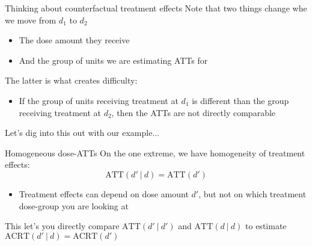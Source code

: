 \documentclass[aspectratio=43,t]{beamer}
\begin{document}
\begin{frame}{Thinking about counterfactual treatment effects}
  Note that two things change whe we move from $d_1$ to $d_2$
  \begin{itemize}
    \item The dose amount they receive

    \item And the group of units we are estimating ATTs for
  \end{itemize}

  \bigskip
  The latter is what creates difficulty:
  \begin{itemize}
    \item If the group of units receiving treatment at $d_1$ is different than the group receiving treatment at $d_2$, then the ATTs are not directly comparable
  \end{itemize}

  \pause
  \bigskip
  Let's dig into this out with our example...
\end{frame}


\begin{frame}{Homogeneous dose-ATTs}
  On the one extreme, we have homogeneity of treatment effects:
  $$
    \text{ATT}(d'  \ | \ d) = \text{ATT}(d')
  $$

  \begin{itemize}
    \item Treatment effects can depend on dose amount $d'$, but not on which treatment dose-group you are looking at
  \end{itemize}

  \pause
  \bigskip\bigskip
  This let's you directly compare $\text{ATT}(d'  \ | \ d')$ and $\text{ATT}(d \ | \ d)$ to estimate $\text{ACRT}(d' \ | \ d) = \text{ACRT}(d')$
\end{frame}


%
%
%
\end{document}
